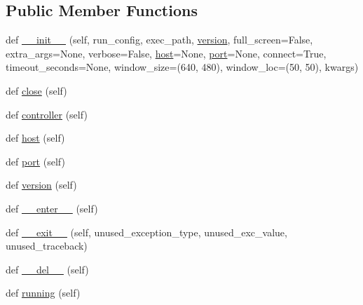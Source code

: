\subsection*{Public Member Functions}
\begin{DoxyCompactItemize}
\item 
def \mbox{\hyperlink{classpysc2_1_1lib_1_1sc__process_1_1_starcraft_process_a2ed5e56a2a9ee1fd1ff65d9391d64576}{\+\_\+\+\_\+init\+\_\+\+\_\+}} (self, run\+\_\+config, exec\+\_\+path, \mbox{\hyperlink{classpysc2_1_1lib_1_1sc__process_1_1_starcraft_process_afa21c71cb3b5c67ef329b5bd334d3880}{version}}, full\+\_\+screen=False, extra\+\_\+args=None, verbose=False, \mbox{\hyperlink{classpysc2_1_1lib_1_1sc__process_1_1_starcraft_process_a8d43a3929ca3e95b1a8c67cd6a7a787b}{host}}=None, \mbox{\hyperlink{classpysc2_1_1lib_1_1sc__process_1_1_starcraft_process_a35b59673e9fe0b5e3d5966629b50570c}{port}}=None, connect=True, timeout\+\_\+seconds=None, window\+\_\+size=(640, 480), window\+\_\+loc=(50, 50), kwargs)
\item 
def \mbox{\hyperlink{classpysc2_1_1lib_1_1sc__process_1_1_starcraft_process_a08f5107eb70dd338f76b625a50ebec01}{close}} (self)
\item 
def \mbox{\hyperlink{classpysc2_1_1lib_1_1sc__process_1_1_starcraft_process_a82f3d7c4a499bca4b47d59e6686f759e}{controller}} (self)
\item 
def \mbox{\hyperlink{classpysc2_1_1lib_1_1sc__process_1_1_starcraft_process_a8d43a3929ca3e95b1a8c67cd6a7a787b}{host}} (self)
\item 
def \mbox{\hyperlink{classpysc2_1_1lib_1_1sc__process_1_1_starcraft_process_a35b59673e9fe0b5e3d5966629b50570c}{port}} (self)
\item 
def \mbox{\hyperlink{classpysc2_1_1lib_1_1sc__process_1_1_starcraft_process_afa21c71cb3b5c67ef329b5bd334d3880}{version}} (self)
\item 
def \mbox{\hyperlink{classpysc2_1_1lib_1_1sc__process_1_1_starcraft_process_a3cdbe783d29d2863ba10ec403cb16e30}{\+\_\+\+\_\+enter\+\_\+\+\_\+}} (self)
\item 
def \mbox{\hyperlink{classpysc2_1_1lib_1_1sc__process_1_1_starcraft_process_a5f633ebeb0a4bb91de5945ed98526970}{\+\_\+\+\_\+exit\+\_\+\+\_\+}} (self, unused\+\_\+exception\+\_\+type, unused\+\_\+exc\+\_\+value, unused\+\_\+traceback)
\item 
def \mbox{\hyperlink{classpysc2_1_1lib_1_1sc__process_1_1_starcraft_process_a2ea4b975a739f0580d91403fe35bc0f1}{\+\_\+\+\_\+del\+\_\+\+\_\+}} (self)
\item 
def \mbox{\hyperlink{classpysc2_1_1lib_1_1sc__process_1_1_starcraft_process_a3937176eb8f9c0baf4f18b455fb42243}{running}} (self)
\end{DoxyCompactItemize}


